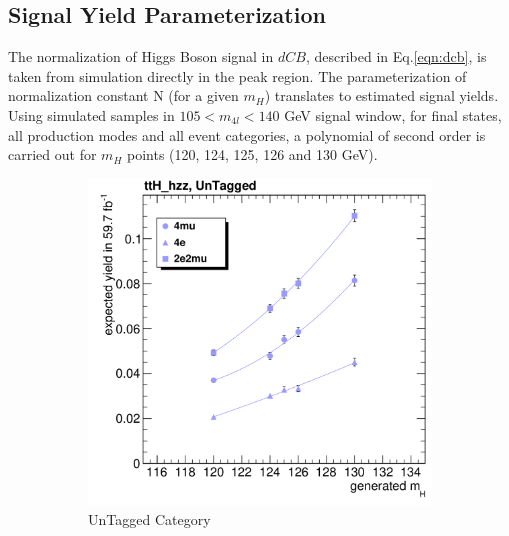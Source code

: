 \subsection{Signal Yield Parameterization}
The normalization of Higgs Boson signal in $dCB$, described in Eq.\ref{eqn:dcb}, is taken from simulation directly in the peak region. The parameterization of normalization constant N (for a given $m_H$) translates to estimated signal yields. Using simulated samples in $ 105 < m_{4l} < 140$ GeV signal window, for final states, all production modes and all event categories, a polynomial of second order is carried out for $m_H$ points (120, 124, 125, 126 and 130 GeV).\\
\begin{figure}[h]
     \centering
     \begin{subfigure}[b]{0.3\textwidth}
         \includegraphics[width=\textwidth]{images/cFits_ttH_hzz_UnTagged_.png}
         \caption{UnTagged Category}
     \end{subfigure}
      \hfill
     \begin{subfigure}[b]{0.3\textwidth}

\end{subfigure}
\end{figure}
